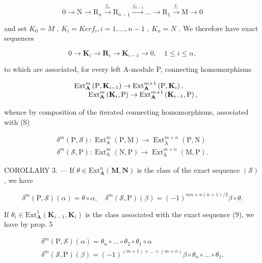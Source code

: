 \[
0 \rightarrow \mathrm{N} \rightarrow \mathrm{R} _ {n} \xrightarrow {f _ {n}} \mathrm{R} _ {n - 1} \xrightarrow {f _ {n - 1}} \dots \rightarrow \mathrm{R} _ {1} \xrightarrow {f _ {1}} \mathrm{M} \rightarrow 0\tag{S}
\]

and set \(K_{0} = M\) , \(K_{i} = Ker f_{i}, i = 1, \ldots, n - 1\) , \(K_{n} = N\) . We therefore have exact sequences

\[
0 \to \mathbf {K} _ {i} \to \mathbf {R} _ {i} \to \mathbf {K} _ {i - 1} \to 0, \quad 1 \leqslant i \leqslant n,\tag{9}
\]

to which are associated, for every left A-module P, connecting homomorphisms

\[
\begin{array}{r l}&{\mathrm{Ext} _ {\mathbf {A}} ^ {m} \left(\mathrm{P}, \mathbf {K} _ {i - 1}\right)\rightarrow \mathrm{Ext} _ {\mathbf {A}} ^ {m + 1} \left(\mathrm{P}, \mathbf {K} _ {i}\right),}\\&{\qquad \mathrm{Ext} _ {\mathbf {A}} ^ {m} \left(\mathbf {K} _ {i}, \mathrm{P}\right)\rightarrow \mathrm{Ext} _ {\mathbf {A}} ^ {m + 1} \left(\mathbf {K} _ {i - 1}, \mathrm{P}\right),}\end{array}
\]

whence by composition of the iterated connecting homomorphisms, associated with (S)

\[
\begin{array}{l} \delta^ {m} (\mathrm{P}, \mathcal {S}): \operatorname{Ext} _ {\mathrm{A}} ^ {m} (\mathrm{P}, \mathrm{M}) \to \operatorname{Ext} _ {\mathrm{A}} ^ {m + n} (\mathrm{P}, \mathrm{N}) \\ \delta^ {m} (\mathcal {S}, \mathrm{P}): \operatorname{Ext} _ {\mathrm{A}} ^ {m} (\mathrm{N}, \mathrm{P}) \to \operatorname{Ext} _ {\mathrm{A}} ^ {m + n} (\mathrm{M}, \mathrm{P}). \end{array}
\]

COROLLARY 3. --- If \(\theta\in\mathrm{Ext}_{\mathbf{A}}^{n}(\mathbf{M},\mathbf{N})\) is the class of the exact sequence \((\mathcal{S})\) , we have

\[
\delta^ {m} (\mathrm{P}, \mathscr {S}) (\alpha) = \theta \circ \alpha , \quad \delta^ {m} (\mathscr {S}, \mathrm{P}) (\beta) = (- 1) ^ {m n + n (n + 1) / 2} \beta \circ \theta .
\]

If \(\theta_{i}\in\mathrm{Ext}_{\mathbf{A}}^{1}(\mathbf{K}_{i-1},\mathbf{K}_{i})\) is the class associated with the exact sequence (9), we have by prop. 5

\[
\begin{array}{l} \delta^ {m} (\mathrm{P}, \mathcal {S}) (\alpha) = \theta_ {n} \circ \dots \circ \theta_ {2} \circ \theta_ {1} \circ \alpha \\ \delta^ {m} (\mathcal {S}, \mathrm{P}) (\beta) = (- 1) ^ {(m + 1) + \dots + (m + n)} \beta \circ \theta_ {n} \circ \dots \circ \theta_ {1}. \end{array}
\]

